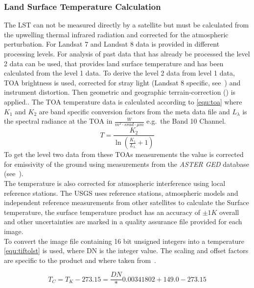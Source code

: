 \documentclass[12pt,a4paper, english]{article}
\begin{document}
    \subsubsection{Land Surface Temperature Calculation}\label{sec:lstcalc}
      The \gls{LST} can not be measured directly by a satellite but must be calculated from the upwelling thermal infrared radiation and corrected for the atmospheric perturbation. 
      For Landsat 7 and Landsat 8 data is provided in different processing levels.
      For analysis of past data that has already be processed the level 2 data can be used, that provides land surface temperature and has been calculated from the level 1 data. 
      To derive the level 2 data from level 1 data, \gls{TOA} brightness is used, corrected for stray light (Landsat 8 specific, see~\autocite[p.~67]{Zanter2019}) and instrument distortion. Then geometric and geographic terrain-correction (\cite[p.~44]{Zanter2019}) is applied..
      The \gls{TOA} temperature data is calculated according to \cref{equ:toa} where $K_1$ and $K_2$ are band specific conversion factors from the meta data file and $L_\lambda$ is the spectral radiance at the TOA in $\frac{W}{m^2\cdot srad \cdot \mu m}$ e.g.\ the Band 10 Channel. 
      \begin{equation}\label{equ:toa}
  	    T = \frac{K_2}{\ln\left(\frac{K_1}{L_{\lambda}}+1\right)}
      \end{equation}
      To get the level two data from these \glspl{TOA} measurements the value is corrected for emissivity of the ground using measurements from the \textit{ASTER GED} database (see~\autocite{USGSWebsite}).\\
      The temperature is also corrected for atmospheric interference using local reference stations. 
      The USGS uses reference stations, atmospheric models and independent reference measurements from other satellites to calculate the Surface temperature, the surface temperature product has an accuracy of $\pm 1 K$ overall and other uncertainties are marked in a quality assurance file provided for each image.\\
      To convert the image file containing 16 bit unsigned integers into a temperature \cref{equ:tiftolst} is used, where DN is the integer value. The scaling and offset factors are specific to the product and where taken from~\autocite{EROASC2013}.
  
      \begin{equation}\label{equ:tiftolst}
        T_C = T_K -273.15 = \frac{DN}*0.00341802 + 149.0 - 273.15 
      \end{equation}
  
\end{document}
